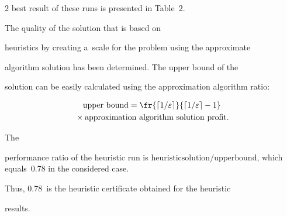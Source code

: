 \begin{multicols}{2}
best result of these runs is presented in Table~2.











 The quality of the solution that is based on


heuristics by creating a~scale for the problem using the approximate


algorithm solution has been determined. The upper bound of the


solution  can be easily calculated using the approximation algorithm ratio:





\vspace*{-5pt}





\noindent


\begin{multline*}


\mathrm{upper\ bound} =


\fr{\lceil1/\varepsilon\rceil}{\lceil1/\varepsilon\rceil-1}


\\


{}\times \mathrm{approximation\ algorithm\ solution\ profit}.


\end{multline*}





\vspace*{-5pt}





\noindent


 The


performance ratio of the heuristic run is ${\mathrm{heuristic


solution}}/{\mathrm{upper bound}}$, which equals~0.78 in the considered case.


Thus, 0.78~is the heuristic certificate obtained for the heuristic


results.








\vspace*{-8pt}






\end{multicols}
